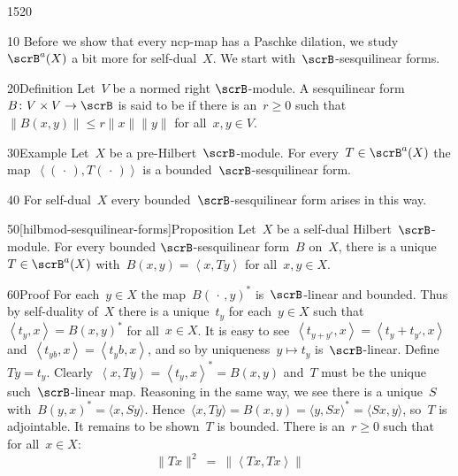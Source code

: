 \begin{parsec}{1520}%
\begin{point}{10}%
    Before we show that every ncp-map has a Paschke dilation,
        we study~$\scrB^a(X)$ a bit more for self-dual~$X$.
    We start with~$\scrB$-sesquilinear forms.
\end{point}
\begin{point}{20}{Definition}%
Let~$V$ be a normed right $\scrB$-module.
A sesquilinear form~$B\colon V\times V \to \scrB$
is said to be 
    if there is an~$r \geq 0$ such that
$\|B(x,y)\| \leq r \|x\|\|y\|$
for all~$x,y \in V$.
\end{point}
\begin{point}{30}{Example}%
Let~$X$ be a pre-Hilbert~$\scrB$-module.
For every~$T \in \scrB^a(X)$
    the map~$\left<(\,\cdot\,), T (\,\cdot\,)\right>$
    is a bounded~$\scrB$-sesquilinear form.
\begin{point}{40}%
    For self-dual~$X$ every bounded~$\scrB$-sesquilinear form
        arises in this way.
\end{point}
\end{point}
\begin{point}{50}[hilbmod-sesquilinear-forms]{Proposition}%
Let~$X$ be a self-dual Hilbert~$\scrB$-module.
For every bounded $\scrB$-sesquilinear form~$B$ on~$X$,
    there is a unique~$T \in \scrB^a(X)$
    with~$B(x,y) = \left<x,Ty\right>$
    for all~$x,y \in X$.
\begin{point}{60}{Proof}
For each~$y \in X$
    the map~$B(\,\cdot\,,y)^*$ is~$\scrB$-linear and bounded.
Thus by self-duality of~$X$
there is a unique~$t_y$
    for each~$y \in X$
    such that~$\left<t_y, x\right> = B(x,y)^*$
    for all~$x \in X$.
It is easy to see~$\left<t_{y+y'},x\right>
                = \left<t_y + t_{y'}, x\right>$
                and~$\left<t_{yb},x\right>
                = \left<t_y b, x\right>$,
    and so by uniqueness~$y \mapsto t_y$ is~$\scrB$-linear.
Define~$Ty = t_y$.
Clearly~$\left<x,Ty\right> = \left<t_y,x\right>^* = B(x,y)$
    and~$T$ must be the unique such~$\scrB$-linear map.
Reasoning in the same way,
    we see there is a unique~$S$
    with~$B(y,x)^* = \langle x, S y \rangle$.
Hence~$\langle x, T y\rangle = B(x,y) 
        = \langle y, Sx\rangle^* = \langle Sx, y \rangle$,
        so~$T$ is adjointable.
It remains to be shown~$T$ is bounded.
There is an~$r \geq 0$ such that for all~$x \in X$:
\begin{equation*}
    \| Tx\|^2 
    \ =\  \|\left<Tx,Tx\right>\|

\end{equation*}
\end{point}
\end{point}
\end{parsec}
